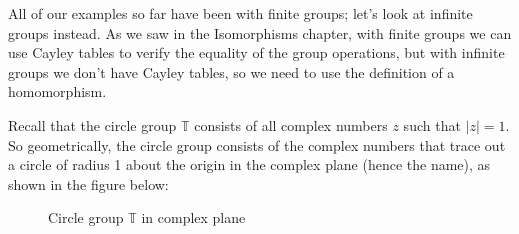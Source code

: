  All of our examples so far have been with finite groups; let's look at infinite groups instead.  As we saw in the Isomorphisms chapter, with finite groups we can use Cayley tables to verify the equality of the group operations, but with infinite groups we don't have  Cayley tables, so we need to use  the definition of a homomorphism.

\begin{example}\label{example:homomorph:homo_T}
Recall that the circle group ${ \mathbb T}$ consists of all complex numbers $z$ such that $|z|=1$. So geometrically, the circle group consists of the complex numbers that trace out a circle of radius 1 about the origin in the complex plane (hence the name), as shown in the figure below:

\begin{figure}[hbt]
\begin{center}

\end{center}
\caption{Circle group ${ \mathbb T}$ in complex plane}
\label{fig:circleGroup}
\end{figure}


\end{example}
